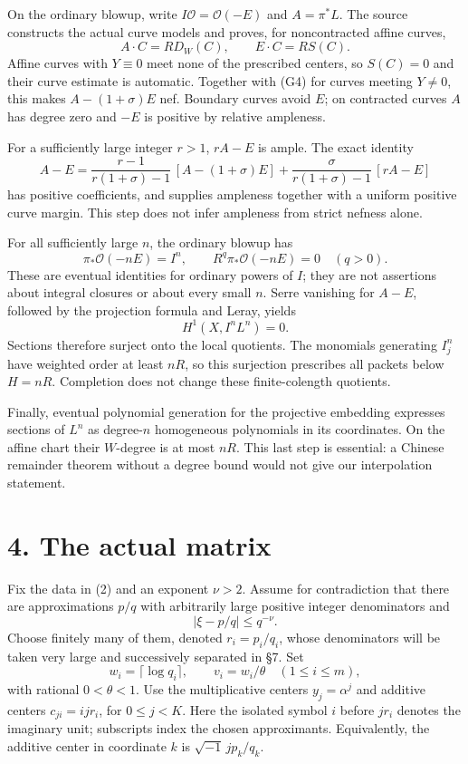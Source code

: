 \documentclass[11pt]{article}
\begin{document}
On the ordinary blowup, write \(I\mathcal O=\mathcal O(-E)\) and
\(A=\pi^*L\). The source constructs the actual curve models and proves,
for noncontracted affine curves, \[
A\cdot C=RD_W(C),\qquad E\cdot C=RS(C).
\] Affine curves with \(Y\equiv0\) meet none of the prescribed centers,
so \(S(C)=0\) and their curve estimate is automatic. Together with (G4)
for curves meeting \(Y\ne0\), this makes \(A-(1+\sigma)E\) nef. Boundary
curves avoid \(E\); on contracted curves \(A\) has degree zero and
\(-E\) is positive by relative ampleness.

For a sufficiently large integer \(r>1\), \(rA-E\) is ample. The exact
identity \[
A-E=
\frac{r-1}{r(1+\sigma)-1}\,[A-(1+\sigma)E]
+\frac{\sigma}{r(1+\sigma)-1}\,[rA-E]
\tag{G6}
\] has positive coefficients, and supplies ampleness together with a
uniform positive curve margin. This step does not infer ampleness from
strict nefness alone.

For all sufficiently large \(n\), the ordinary blowup has \[
\pi_*\mathcal O(-nE)=I^n,\qquad R^q\pi_*\mathcal O(-nE)=0\quad(q>0).
\] These are eventual identities for ordinary powers of \(I\); they are
not assertions about integral closures or about every small \(n\). Serre
vanishing for \(A-E\), followed by the projection formula and Leray,
yields \[
H^1(X,I^nL^n)=0.
\] Sections therefore surject onto the local quotients. The monomials
generating \(I_j^n\) have weighted order at least \(nR\), so this
surjection prescribes all packets below \(H=nR\). Completion does not
change these finite-colength quotients.

Finally, eventual polynomial generation for the projective embedding
expresses sections of \(L^n\) as degree-\(n\) homogeneous polynomials in
its coordinates. On the affine chart their \(W\)-degree is at most
\(nR\). This last step is essential: a Chinese remainder theorem without
a degree bound would not give our interpolation statement.

\section{4. The actual matrix}\label{the-actual-matrix}

Fix the data in (2) and an exponent \(\nu>2\). Assume for contradiction
that there are approximations \(p/q\) with arbitrarily large positive
integer denominators and \[
|\xi-p/q|\le q^{-\nu}.
\] Choose finitely many of them, denoted \(r_i=p_i/q_i\), whose
denominators will be taken very large and successively separated in §7.
Set \[
w_i=\lceil\log q_i\rceil,\qquad v_i=w_i/\theta\quad(1\le i\le m),
\] with rational \(0<\theta<1\). Use the multiplicative centers
\(y_j=\alpha^j\) and additive centers \(c_{ji}=ijr_i\), for
\(0\le j<K\). Here the isolated symbol \(i\) before \(jr_i\) denotes the
imaginary unit; subscripts index the chosen approximants. Equivalently,
the additive center in coordinate \(k\) is \(\sqrt{-1}\,j p_k/q_k\).
\end{document}
